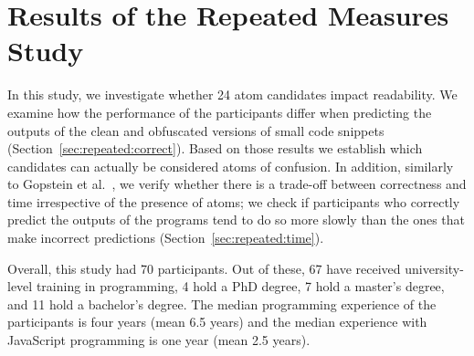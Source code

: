 

\label{sec:survey-resuts} 

\section{Results of the Repeated Measures Study}\label{sec:repeated}

In this study, we investigate whether 24 atom candidates impact readability. We examine how the performance of the participants differ when predicting the outputs of the clean and obfuscated versions of small code snippets (Section~\ref{sec:repeated:correct}). Based on those results we establish which candidates can actually be considered atoms of confusion. In addition, similarly to Gopstein et al.~\cite{DBLP:conf/sigsoft/GopsteinIYDZYC17}, we verify whether there is a trade-off between correctness and time irrespective of the presence of atoms; we check if participants who correctly predict the outputs of the programs tend to do so more slowly than the ones that make incorrect predictions (Section~\ref{sec:repeated:time}). 

Overall, this study had 70 participants. Out of these, 67 have received university-level training in programming, 4 hold a PhD degree, 7 hold a master's degree, and 11 hold a bachelor's degree. 
The median programming experience of the participants is four years (mean 6.5 years) and the median experience with JavaScript programming is one year (mean 2.5 years). 

